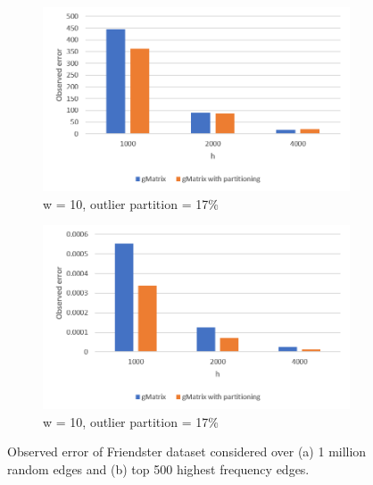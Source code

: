 \begin{figure}[!htbp]
\centering
\begin{subfigure}{.5\textwidth}
  \centering
  \includegraphics[width=1\linewidth]{F1}
  \caption{w = 10, outlier partition = 17\%}
  \label{fig:sub1}
\end{subfigure}%
\begin{subfigure}{.5\textwidth}
  \centering
  \includegraphics[width=1\linewidth]{F1T}
  \caption{w = 10, outlier partition = 17\%}
  \label{fig:sub2}
\end{subfigure}
\caption{Observed error of Friendster dataset considered over (a) 1 million random edges and (b) top 500 highest frequency edges.}
\label{fig:f1}
\end{figure}

